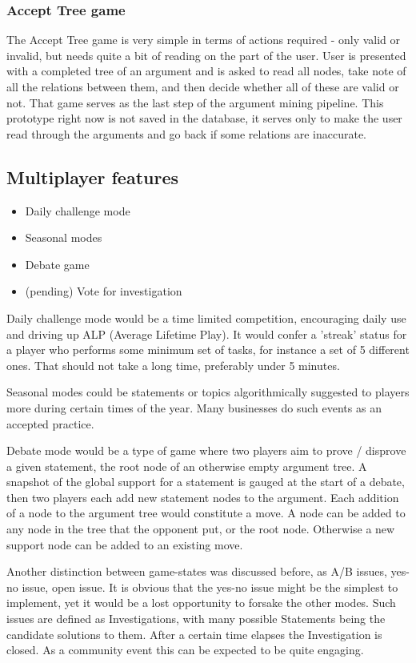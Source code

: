 \documentclass{report}
\begin{document}
\subsubsection{Accept Tree game}
The Accept Tree game is very simple in terms of actions required - only valid or invalid, but needs quite a bit of reading on the part of the user.
User is presented with a completed tree of an argument and is asked to read all nodes, take note of all the relations between them, and then decide whether all of these are valid or not.
That game serves as the last step of the argument mining pipeline. This prototype right now is not saved in the database, it serves only to make the user read through the arguments and go back if some relations are inaccurate.

\subsection{Multiplayer features}
\begin{itemize}
  \item Daily challenge mode
  \item Seasonal modes
  \item Debate game
  \item (pending) Vote for investigation
\end{itemize}
Daily challenge mode would be a time limited competition, encouraging daily use and driving up ALP (Average Lifetime Play). It would confer a 'streak' status for a player who performs some minimum set of tasks, for instance a set of 5 different ones. That should not take a long time, preferably under 5 minutes.

Seasonal modes could be statements or topics algorithmically suggested to players more during certain times of the year. Many businesses do such events as an accepted practice.

Debate mode would be a type of game where two players aim to prove / disprove a given statement, the root node of an otherwise empty argument tree.  A snapshot of the global support for a statement is gauged at the start of a debate, then two players each add new statement nodes to the argument. Each addition of a node to the argument tree would constitute a move.
A node can be added to any node in the tree that the opponent put, or the root node. Otherwise a new support node can be added to an existing move.

Another distinction between game-states was discussed before, as A/B issues, yes-no issue, open issue. It is obvious that the yes-no issue might be the simplest to implement, yet it would be a lost opportunity to forsake the other modes.
Such issues are defined as Investigations, with many possible Statements being the candidate solutions to them. After a certain time elapses the Investigation is closed. As a community event this can be expected to be quite engaging.
\end{document}
